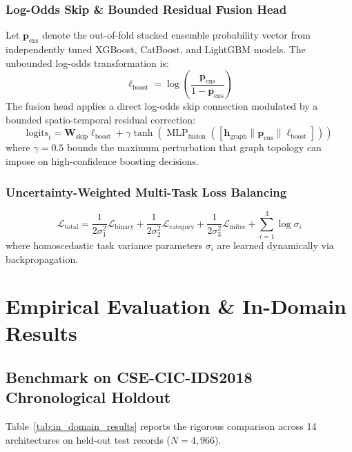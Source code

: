 \documentclass[11pt,a4paper]{article}
\begin{document}
\subsubsection{Log-Odds Skip \& Bounded Residual Fusion Head}
Let $\mathbf{p}_{\text{ens}}$ denote the out-of-fold stacked ensemble probability vector from independently tuned XGBoost, CatBoost, and LightGBM models. The unbounded log-odds transformation is:
\begin{equation}
\boldsymbol{\ell}_{\text{boost}} = \log\left(\frac{\mathbf{p}_{\text{ens}}}{1 - \mathbf{p}_{\text{ens}}}\right)
\end{equation}
The fusion head applies a direct log-odds skip connection modulated by a bounded spatio-temporal residual correction:
\begin{equation}
\text{logits}_t = \mathbf{W}_{\text{skip}} \boldsymbol{\ell}_{\text{boost}} + \gamma \tanh\left(\operatorname{MLP}_{\text{fusion}}\left(\left[\mathbf{h}_{\text{graph}} \parallel \mathbf{p}_{\text{ens}} \parallel \boldsymbol{\ell}_{\text{boost}}\right]\right)\right)
\end{equation}
where $\gamma = 0.5$ bounds the maximum perturbation that graph topology can impose on high-confidence boosting decisions.

\subsubsection{Uncertainty-Weighted Multi-Task Loss Balancing}
\begin{equation}
\mathcal{L}_{\text{total}} = \frac{1}{2\sigma_1^2} \mathcal{L}_{\text{binary}} + \frac{1}{2\sigma_2^2} \mathcal{L}_{\text{category}} + \frac{1}{2\sigma_3^2} \mathcal{L}_{\text{mitre}} + \sum_{i=1}^3 \log \sigma_i
\end{equation}
where homoscedastic task variance parameters $\sigma_i$ are learned dynamically via backpropagation.

\section{Empirical Evaluation \& In-Domain Results}
\label{sec:results}

\subsection{Benchmark on CSE-CIC-IDS2018 Chronological Holdout}
Table~\ref{tab:in_domain_results} reports the rigorous comparison across 14 architectures on held-out test records ($N = 4,966$).
\end{document}
